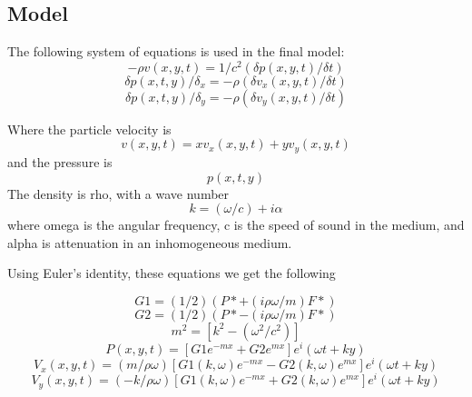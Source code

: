 \documentclass{article}
\begin{document}
\subsection{Model}
The following system of equations is used in the final model:
\begin{equation}
    -\rho v(x,y,t) = 1/c^2(\delta p(x,y,t)/\delta t)
\end{equation}
\begin{equation}
    \delta p(x,t,y)/\delta_x = -\rho (\delta v_x(x,y,t)/\delta t)
\end{equation}
\begin{equation}
    \delta p(x,t,y)/\delta_y = -\rho (\delta v_y(x,y,t)/\delta t)
\end{equation}

Where the particle velocity is
\begin{equation}
    v(x,y,t) = xv_x(x,y,t) + yv_y(x,y,t)
\end{equation}
and the pressure is
\begin{equation}
    p(x,t,y)
\end{equation}
The density is rho, with a wave number 
\begin{equation}
    k = (\omega/c) + i\alpha
\end{equation}
where omega is the angular frequency, c is the speed of sound in the medium, and alpha is attenuation in an
inhomogeneous medium.

Using Euler's identity, these equations we get the following

\begin{equation}
    G1 = (1/2)(P* + (i\rho\omega/m)F*)
\end{equation}
\begin{equation}
    G2 = (1/2)(P* - (i\rho\omega/m)F*) 
\end{equation}
\begin{equation}
    m^2 = [k^2 - (\omega^2/c^2)]
\end{equation}
\begin{equation}
    P(x,y,t) = [G1e^{-mx} +G2e^{mx}]e^i(\omega t + ky)
\end{equation}
\begin{equation}
    V_x(x,y,t) = (m/\rho\omega)[G1(k,\omega)e^{-mx} - G2(k,\omega)e^{mx}]e^i(\omega t+ky)
\end{equation}
\begin{equation}
    V_y(x,y,t) = (-k/\rho\omega)[G1(k,\omega)e^{-mx} + G2(k,\omega)e^{mx}]e^i(\omega t+ky)
\end{equation}
\end{document}
